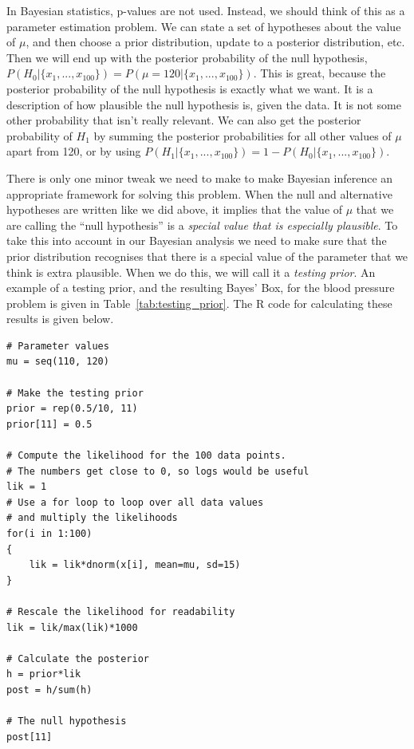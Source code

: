 In Bayesian statistics, p-values are not used. Instead, we should think of this
as a parameter estimation problem. We can state a set of hypotheses about the
value of $\mu$, and then choose a prior distribution, update to a posterior
distribution, etc. Then we will end up with the posterior probability of the
null hypothesis, $P(H_0 | \{x_1, ..., x_{100}\}) = P(\mu = 120 | \{x_1, ..., x_{100}\})$.
This is great, because the posterior probability of the null hypothesis is
exactly what we want. It is a description of how plausible the null hypothesis
is, given the data. It is not some other probability that isn't really relevant.
We can also get the posterior probability of $H_1$ by summing the posterior
probabilities for all other values of $\mu$ apart from 120, or by using
$P(H_1 | \{x_1,...,x_{100}\}) = 1 - P(H_0 | \{x_1,...,x_{100}\})$.

There is only one minor tweak we need to make to make Bayesian inference an
appropriate framework for solving this problem. When the null and alternative
hypotheses are written like we did above, it implies that the value of $\mu$
that we are calling the ``null hypothesis'' is a {\it special value that is
especially plausible}. To take this into account in our Bayesian analysis we
need to make sure that the prior distribution recognises that there is a special
value of the parameter that we think is extra plausible. When we do this, we
will call it a {\it testing prior}. An example of a testing prior, and the
resulting Bayes' Box, for
the blood pressure problem is given in Table~\ref{tab:testing_prior}.
The R code for calculating these results is given below.

\begin{framed}
\begin{verbatim}
# Parameter values
mu = seq(110, 120)

# Make the testing prior
prior = rep(0.5/10, 11)
prior[11] = 0.5

# Compute the likelihood for the 100 data points.
# The numbers get close to 0, so logs would be useful
lik = 1
# Use a for loop to loop over all data values
# and multiply the likelihoods
for(i in 1:100)
{
    lik = lik*dnorm(x[i], mean=mu, sd=15)
}

# Rescale the likelihood for readability
lik = lik/max(lik)*1000

# Calculate the posterior
h = prior*lik
post = h/sum(h)

# The null hypothesis
post[11]
\end{verbatim}
\end{framed}


